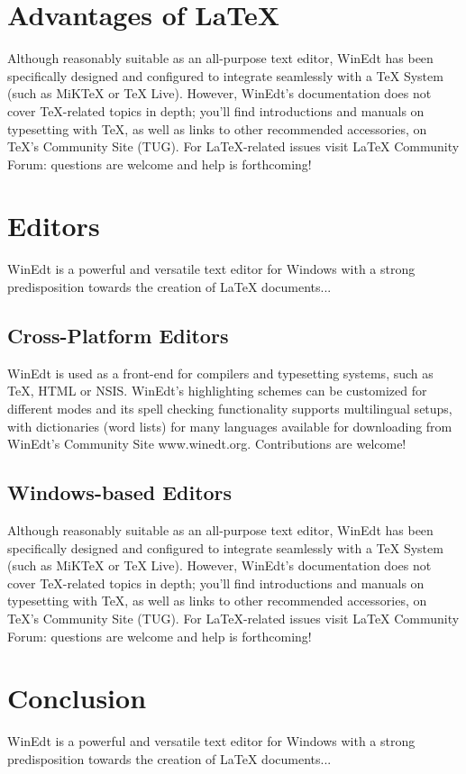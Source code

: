 \documentclass[11pt,a4paper]{article}
\begin{document}
\section{Advantages of \LaTeX{}} \label{section.latex}

Although reasonably suitable as an all-purpose text editor, WinEdt has been specifically designed and configured to integrate seamlessly with a TeX System (such as MiKTeX or TeX Live). However, WinEdt's documentation does not cover TeX-related topics in depth; you'll find introductions and manuals on typesetting with TeX, as well as links to other recommended accessories, on TeX's Community Site (TUG). For LaTeX-related issues visit LaTeX Community Forum: questions are welcome and help is forthcoming!

\section{Editors} \label{section.editors}

WinEdt is a powerful and versatile text editor for Windows with a strong predisposition towards the creation of LaTeX documents...

\subsection{Cross-Platform Editors} \label{section.editors.cross}

WinEdt is used as a front-end for compilers and typesetting systems, such as TeX, HTML or NSIS. WinEdt's highlighting schemes can be customized for different modes and its spell checking functionality supports multilingual setups, with dictionaries (word lists) for many languages available for downloading from WinEdt's Community Site www.winedt.org. Contributions are welcome!

\subsection{Windows-based Editors} \label{section.editors.win}

Although reasonably suitable as an all-purpose text editor, WinEdt has been specifically designed and configured to integrate seamlessly with a TeX System (such as MiKTeX or TeX Live). However, WinEdt's documentation does not cover TeX-related topics in depth; you'll find introductions and manuals on typesetting with TeX, as well as links to other recommended accessories, on TeX's Community Site (TUG). For LaTeX-related issues visit LaTeX Community Forum: questions are welcome and help is forthcoming!

\section{Conclusion} \label{section.conclusion}

WinEdt is a powerful and versatile text editor for Windows with a strong predisposition towards the creation of LaTeX documents...




\end{document}
